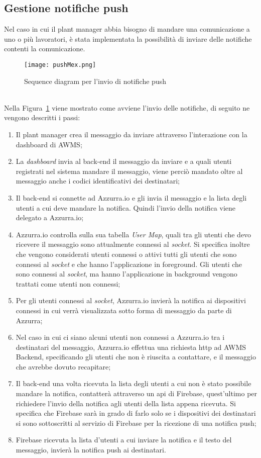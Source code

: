 \subsection{Gestione notifiche push}
Nel caso in cui il \gls{plant manager}\ap{[g]} abbia bisogno di mandare una comunicazione a uno o più lavoratori, è stata implementata la possibilità di inviare delle notifiche contenti la comunicazione.
\begin{figure}[h]
	\begin{center}
		\texttt{[image: pushMex.png]}
		\caption{Sequence diagram per l'invio di notifiche push}\label{fig:push}
	\end{center}
\end{figure}\\
Nella Figura~\ref{fig:push} viene mostrato come avviene l'invio delle notifiche, di seguito ne vengono descritti i passi:
\begin{enumerate}
	\item Il \gls{plant manager}\ap{[g]} crea il messaggio da inviare attraverso l'interazione con la dashboard di \gls{AWMS};
	\item La \emph{dashboard} invia al back-end il messaggio da inviare e a quali utenti registrati nel sistema mandare il messaggio, viene perciò mandato oltre al messaggio anche i codici identificativi dei destinatari;
	\item Il back-end si connette ad Azzurra.io e gli invia il messaggio e la lista degli utenti a cui deve mandare la notifica. Quindi l'invio della notifica viene delegato a Azzurra.io; 
	\item Azzurra.io controlla sulla sua tabella \emph{User Map}, quali tra gli utenti che devo ricevere il messaggio sono attualmente connessi al \emph{socket}. Si specifica inoltre che vengono considerati utenti connessi o attivi tutti gli utenti che sono connessi al \emph{socket} e che hanno l’applicazione in foreground. Gli utenti che sono connessi al \emph{socket}, ma hanno l’applicazione in background vengono trattati come utenti non connessi;
	\item Per gli utenti connessi al \emph{socket}, Azzurra.io invierà la notifica ai dispositivi connessi in cui verrà visualizzata sotto forma di messaggio da parte di Azzurra;
	\item Nel caso in cui ci siano alcuni utenti non connessi a Azzurra.io tra i destinatari del messaggio, Azzurra.io effettua una richiesta \gls{http}\ap{[g]} ad AWMS Backend, specificando gli utenti che non è riuscita a contattare, e il messaggio che avrebbe dovuto recapitare;
	\item Il back-end una volta ricevuta la lista degli utenti a cui non è stato possibile mandare la notifica, contatterà attraverso un \gls{api}\ap{[g]} di Firebase, quest'ultimo per richiedere l'invio della notifica agli utenti della lista appena ricevuta. Si specifica che Firebase sarà in grado di farlo solo se i dispositivi dei destinatari si sono sottoscritti al servizio di Firebase per la ricezione di una \gls{notifica push}\ap{[g]};
	\item Firebase ricevuta la lista d'utenti a cui inviare la notifica e il testo del messaggio, invierà la \gls{notifica push}\ap{[g]} ai destinatari.
\end{enumerate}